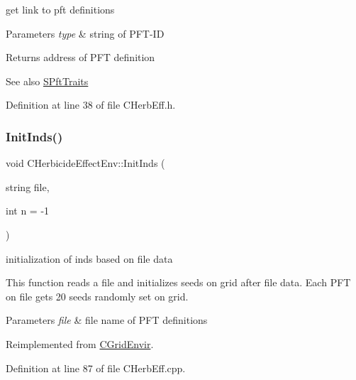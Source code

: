 get link to pft definitions 


\begin{DoxyParams}{Parameters}
{\em type} & string of P\+F\+T-\/\+ID \\
\hline
\end{DoxyParams}
\begin{DoxyReturn}{Returns}
address of P\+FT definition 
\end{DoxyReturn}
\begin{DoxySeeAlso}{See also}
\mbox{\hyperlink{class_s_pft_traits}{S\+Pft\+Traits}} 
\end{DoxySeeAlso}


Definition at line 38 of file C\+Herb\+Eff.\+h.

\mbox{\label{class_c_herbicide_effect_env_a4382fa3250eb3b44613707fdffd77838}} 
\subsubsection{\texorpdfstring{InitInds()}{InitInds()}}
{\footnotesize\ttfamily void C\+Herbicide\+Effect\+Env\+::\+Init\+Inds (\begin{DoxyParamCaption}\item[{string}]{file,  }\item[{int}]{n = {\ttfamily -\/1} }\end{DoxyParamCaption})\hspace{0.3cm}{\ttfamily [virtual]}}



initialization of inds based on file data 

This function reads a file and initializes seeds on grid after file data. Each P\+FT on file gets 20 seeds randomly set on grid. 
\begin{DoxyParams}{Parameters}
{\em file} & file name of P\+FT definitions \\
\hline
\end{DoxyParams}


Reimplemented from \mbox{\hyperlink{class_c_grid_envir_a0b5b1fcf08b608c6aed31fea9325c62b}{C\+Grid\+Envir}}.



Definition at line 87 of file C\+Herb\+Eff.\+cpp.

\mbox{\label{class_c_herbicide_effect_env_a307a82e619105086fd02eca98c48f8b6}} 
